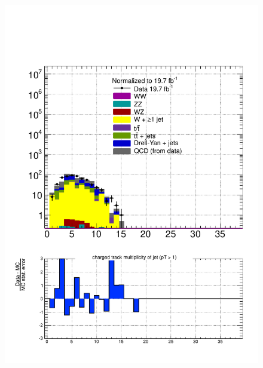 \begin{figure}[hbtp]
  \begin{center}
    \includegraphics[width=\cmsFigWidth]{figures/dataVsMCQCD_muHadNchtrk1_lowMT_v87}

\end{center}
\end{figure}
